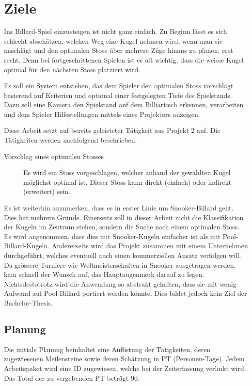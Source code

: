 \chapter{Ziele}
Ins Billard-Spiel einzusteigen ist nicht ganz einfach. Zu Beginn lässt es sich schlecht abschätzen,
welchen Weg eine Kugel nehmen wird, wenn man sie anschlägt und den optimalen Stoss über mehrere Züge hinaus zu planen,
erst recht. Denn bei fortgeschrittenen Spielen ist es oft wichtig, dass die weisse Kugel optimal für den nächsten Stoss
platziert wird.

Es soll ein System entstehen, das dem Spieler den optimalen Stoss vorschlägt basierend auf Kriterien und
optional einer festgelegten Tiefe des Spielstands. Dazu soll eine Kamera den Spielstand auf dem Billiartisch erkennen, verarbeiten und
dem Spieler Hilfestellungen mittels eines Projektors anzeigen.

Diese Arbeit setzt auf bereits geleisteter Tätigkeit aus \glqq Projekt 2\grqq{} auf\cite{project2:ziele}. Die
Tätigkeiten werden nachfolgend beschrieben.
\begin{description}
    \item[Vorschlag eines optimalen Stosses] Es wird ein Stoss vorgeschlagen, welcher anhand der gewählten Kugel
    möglichst optimal ist. Dieser Stoss kann direkt (einfach) oder indirekt (erweitert) sein.
\end{description}

Es ist weiterhin anzumerken, dass es in erster Linie um Snooker-Billard geht. Dies hat mehrere Gründe. Einerseits soll
in dieser Arbeit nicht die Klassifikation der Kugeln im Zentrum stehen, sondern die Suche nach einem optimalen Stoss.
Es wird angenommen, dass dies mit Snooker-Kugeln einfacher ist als mit Pool-Billard-Kugeln. Andererseits wird das
Projekt zusammen mit einem Unternehmen durchgeführt, welches eventuell auch einen kommerziellen Ansatz verfolgen
will. Da grössere Turniere wie Weltmeisterschaften in Snooker ausgetragen werden, kam schnell der Wunsch auf, das
Hauptaugenmerk darauf zu legen. Nichtsdestotrotz wird die Anwendung so abstrakt gehalten, dass sie mit wenig Aufwand
auf Pool-Billard portiert werden könnte. Dies bildet jedoch kein Ziel der Bachelor-Thesis.

\newpage

\section{Planung}
Die initiale Planung beinhaltet eine Auflistung der Tätigkeiten, deren zugewiesenen Meilensteine sowie
deren Schätzung in PT (Personen-Tage). Jedem Arbeitspaket wird eine ID zugewiesen,
welche bei der Zeiterfassung verlinkt wird. Das Total der zu vergebenden PT beträgt 90.

